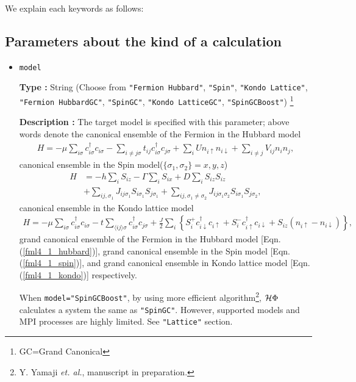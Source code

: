 We explain each keywords as follows:

\subsection{Parameters about the kind of a calculation}

\begin{itemize}

\item \verb|model|

{\bf Type :} String (Choose from \verb|"Fermion Hubbard"|, \verb|"Spin"|, \verb|"Kondo Lattice"|, 
\verb|"Fermion HubbardGC"|, \verb|"SpinGC"|, \verb|"Kondo LatticeGC"|, \verb|"SpinGCBoost"|)
\footnote{GC=Grand Canonical}

{\bf Description :} The target model is specified with this parameter;
above words denote the canonical ensemble of the Fermion in the Hubbard model
\begin{align}
H = -\mu \sum_{i \sigma} c^\dagger_{i \sigma} c_{i \sigma} 
- \sum_{i \neq j \sigma} t_{i j} c^\dagger_{i \sigma} c_{j \sigma} 
+ \sum_{i} U n_{i \uparrow} n_{i \downarrow}
+ \sum_{i \neq j} V_{i j} n_{i} n_{j},
\label{fml4_1_hubbard}
\end{align}
canonical ensemble in the Spin model($\{\sigma_1, \sigma_2\}={x, y, z}$)
\begin{align}
H &= -h \sum_{i} S_{i z} - \Gamma \sum_{i} S_{i x} + D \sum_{i} S_{i z} S_{i z}
\nonumber \\
&+ \sum_{i j, \sigma_1}J_{i j \sigma_1} S_{i \sigma_1} S_{j \sigma_1}+ \sum_{i j, \sigma_1 \neq \sigma_2} J_{i j \sigma_1 \sigma_2} S_{i \sigma_1} S_{j \sigma_2} ,
\label{fml4_1_spin}
\end{align}
canonical ensemble in the Kondo lattice model
\begin{align}
H = - \mu \sum_{i \sigma} c^\dagger_{i \sigma} c_{i \sigma} 
- t \sum_{\langle i j \rangle \sigma} c^\dagger_{i \sigma} c_{j \sigma} 
+ \frac{J}{2} \sum_{i} \left\{
S_{i}^{+} c_{i \downarrow}^\dagger c_{i \uparrow}
+ S_{i}^{-} c_{i \uparrow}^\dagger c_{i \downarrow}
+ S_{i z} (n_{i \uparrow} - n_{i \downarrow})
\right\},
\label{fml4_1_kondo}
\end{align}
grand canonical ensemble of the Fermion in the Hubbard model [Eqn. (\ref{fml4_1_hubbard})],
grand canonical ensemble in the Spin model [Eqn. (\ref{fml4_1_spin})],
and
grand canonical ensemble in Kondo lattice model [Eqn. (\ref{fml4_1_kondo})]
respectively.

When \verb|model="SpinGCBoost"|,
by using more efficient algorithm\footnote{Y. Yamaji \textit{et. al.}, manuscript in preparation.}, 
$\mathcal{H} \Phi$ calculates a system the same as \verb|"SpinGC"|.
However, supported models and MPI processes are highly limited.
See \verb|"Lattice"| section.


\end{itemize}
